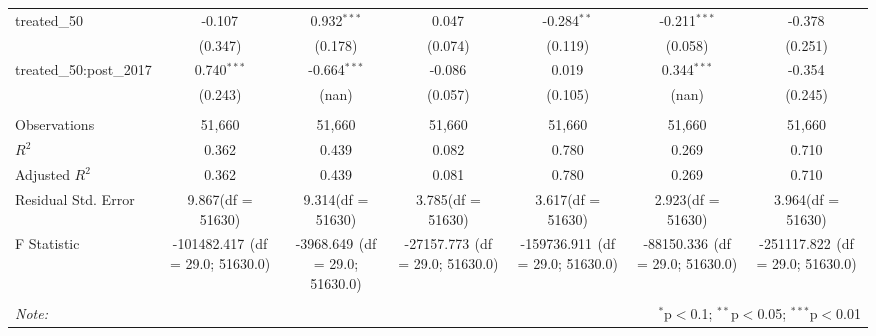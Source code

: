 \begin{table}[!htbp]
\begin{tabular}{@{\extracolsep{5pt}}lcccccc}
 treated_50 & -0.107$^{}$ & 0.932$^{***}$ & 0.047$^{}$ & -0.284$^{**}$ & -0.211$^{***}$ & -0.378$^{}$ \\
  & (0.347) & (0.178) & (0.074) & (0.119) & (0.058) & (0.251) \\
 treated_50:post_2017 & 0.740$^{***}$ & -0.664$^{***}$ & -0.086$^{}$ & 0.019$^{}$ & 0.344$^{***}$ & -0.354$^{}$ \\
  & (0.243) & (nan) & (0.057) & (0.105) & (nan) & (0.245) \\
\hline \\[-1.8ex]
 Observations & 51,660 & 51,660 & 51,660 & 51,660 & 51,660 & 51,660 \\
 $R^2$ & 0.362 & 0.439 & 0.082 & 0.780 & 0.269 & 0.710 \\
 Adjusted $R^2$ & 0.362 & 0.439 & 0.081 & 0.780 & 0.269 & 0.710 \\
 Residual Std. Error & 9.867(df = 51630) & 9.314(df = 51630) & 3.785(df = 51630) & 3.617(df = 51630) & 2.923(df = 51630) & 3.964(df = 51630)  \\
 F Statistic & -101482.417$^{}$ (df = 29.0; 51630.0) & -3968.649$^{}$ (df = 29.0; 51630.0) & -27157.773$^{}$ (df = 29.0; 51630.0) & -159736.911$^{}$ (df = 29.0; 51630.0) & -88150.336$^{}$ (df = 29.0; 51630.0) & -251117.822$^{}$ (df = 29.0; 51630.0) \\
\hline
\hline \\[-1.8ex]
\textit{Note:} & \multicolumn{6}{r}{$^{*}$p$<$0.1; $^{**}$p$<$0.05; $^{***}$p$<$0.01} \\
\end{tabular}
\end{table}